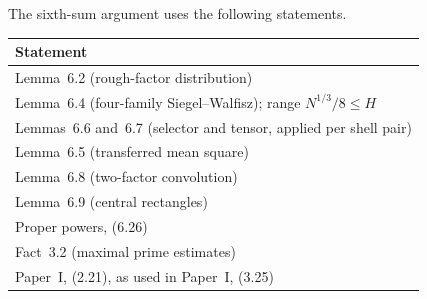 The sixth-sum argument uses the following statements.
\begin{center}
\small
\begin{tabular}{@{}>{\raggedright\arraybackslash}p{}@{}}
\hline
Statement\\
\hline
Lemma~6.2 (rough-factor distribution)\\
Lemma~6.4 (four-family Siegel--Walfisz); range \(N^{1/3}/8\le H\)\\
Lemmas~6.6 and~6.7 (selector and tensor, applied per shell pair)\\
Lemma~6.5 (transferred mean square)\\
Lemma~6.8 (two-factor convolution)\\
Lemma~6.9 (central rectangles)\\
Proper powers, (6.26)\\
Fact~3.2 (maximal prime estimates)\\
Paper~I, (2.21), as used in Paper~I, (3.25)\\
\hline
\end{tabular}
\end{center}
